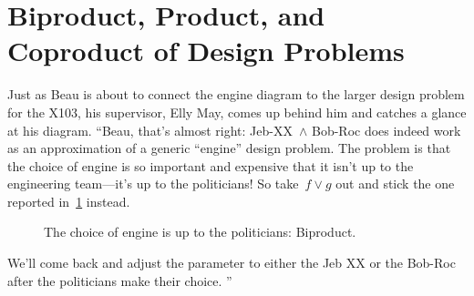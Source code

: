 
\section{Biproduct, Product, and Coproduct of Design Problems}
\begin{example}
    Just as Beau is about to connect the engine diagram to the larger design problem for the X103, his supervisor, Elly May, comes up behind him and catches a glance at his diagram.
    ``Beau, that's almost right: Jeb-XX~$\wedge$ Bob-Roc does indeed work as an approximation of a generic ``engine'' design problem.
    The problem is that the choice of engine is so important and expensive that it isn't up to the engineering team---it's up to the politicians!
    So take~$f \vee g$ out and stick the one reported in~\cref{fig:exbiproduct} instead.
    \begin{figure}[h!]
        \begin{center}
        \end{center}
        \caption{The choice of engine is up to the politicians: Biproduct.}
        \label{fig:exbiproduct}
    \end{figure}

    We'll come back and adjust the parameter to either the Jeb XX or the Bob-Roc after the politicians make their choice.
    ''
\end{example}
